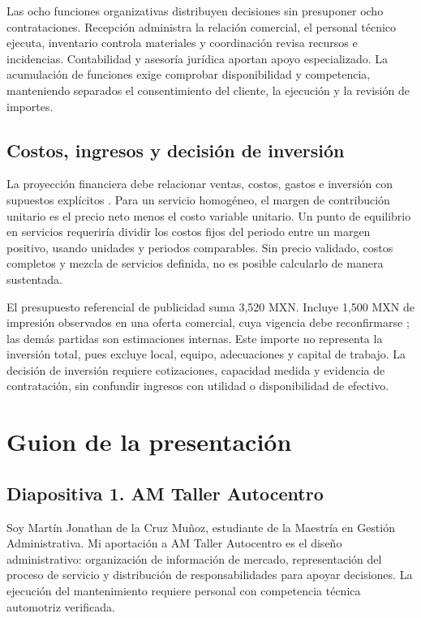 {Las ocho funciones organizativas distribuyen decisiones sin presuponer ocho contrataciones. Recepción administra la relación comercial, el personal técnico ejecuta, inventario controla materiales y coordinación revisa recursos e incidencias. Contabilidad y asesoría jurídica aportan apoyo especializado. La acumulación de funciones exige comprobar disponibilidad y competencia, manteniendo separados el consentimiento del cliente, la ejecución y la revisión de importes.

\subsection{Costos, ingresos y decisión de inversión}
La proyección financiera debe relacionar ventas, costos, gastos e inversión con supuestos explícitos \citep{openstaxPlanIntegrador}. Para un servicio homogéneo, el margen de contribución unitario es el precio neto menos el costo variable unitario. Un punto de equilibrio en servicios requeriría dividir los costos fijos del periodo entre un margen positivo, usando unidades y periodos comparables. Sin precio validado, costos completos y mezcla de servicios definida, no es posible calcularlo de manera sustentada.

El presupuesto referencial de publicidad suma 3,520 MXN. Incluye 1,500 MXN de impresión observados en una oferta comercial, cuya vigencia debe reconfirmarse \citep{volanteoMonterreyPromociones}; las demás partidas son estimaciones internas. Este importe no representa la inversión total, pues excluye local, equipo, adecuaciones y capital de trabajo. La decisión de inversión requiere cotizaciones, capacidad medida y evidencia de contratación, sin confundir ingresos con utilidad o disponibilidad de efectivo.

\section{Guion de la presentación}

\subsection{Diapositiva 1. AM Taller Autocentro}
Soy Martín Jonathan de la Cruz Muñoz, estudiante de la Maestría en Gestión Administrativa. Mi aportación a AM Taller Autocentro es el diseño administrativo: organización de información de mercado, representación del proceso de servicio y distribución de responsabilidades para apoyar decisiones. La ejecución del mantenimiento requiere personal con competencia técnica automotriz verificada.

}
